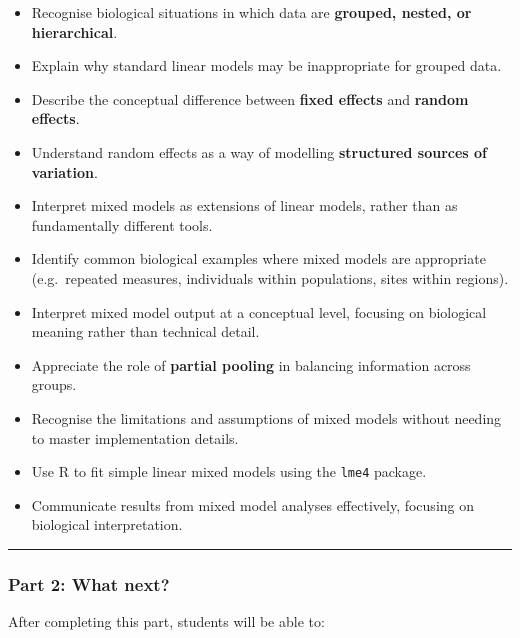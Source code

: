 \documentclass[
  letterpaper,
  8pt,
  a4paper]{book}
\providecommand{\tightlist}{%
  \setlength{\itemsep}{0pt}\setlength{\parskip}{0pt}}
\begin{document}
\begin{itemize}
\tightlist
\item
  Recognise biological situations in which data are \textbf{grouped,
  nested, or hierarchical}.
\item
  Explain why standard linear models may be inappropriate for grouped
  data.
\item
  Describe the conceptual difference between \textbf{fixed effects} and
  \textbf{random effects}.
\item
  Understand random effects as a way of modelling \textbf{structured
  sources of variation}.
\item
  Interpret mixed models as extensions of linear models, rather than as
  fundamentally different tools.
\item
  Identify common biological examples where mixed models are appropriate
  (e.g.~repeated measures, individuals within populations, sites within
  regions).
\item
  Interpret mixed model output at a conceptual level, focusing on
  biological meaning rather than technical detail.
\item
  Appreciate the role of \textbf{partial pooling} in balancing
  information across groups.
\item
  Recognise the limitations and assumptions of mixed models without
  needing to master implementation details.
\item
  Use R to fit simple linear mixed models using the \texttt{lme4}
  package.
\item
  Communicate results from mixed model analyses effectively, focusing on
  biological interpretation.
\end{itemize}

\begin{center}\rule{0.5\linewidth}{0.5pt}\end{center}

\subsubsection*{Part 2: What next?}\label{part-2-what-next}

After completing this part, students will be able to:
\end{document}
